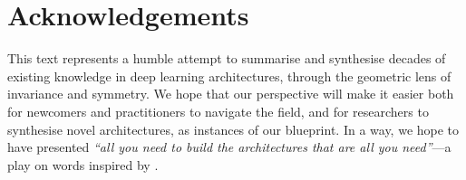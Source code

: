 

\section*{Acknowledgements}

This text
represents a humble attempt to summarise and synthesise decades of existing knowledge in %
deep learning architectures, through the geometric lens of invariance and symmetry. 
% 
%
We hope that our perspective 
will make it easier both for newcomers and practitioners to navigate the field, and for researchers to synthesise novel architectures, as instances of our blueprint. In a way, we hope to have presented \emph{``all you need to build the architectures that are all you need''}---a play on words inspired by \citet{vaswani2017attention}.



